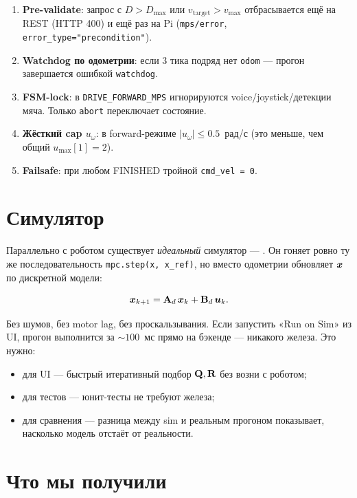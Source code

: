 \begin{enumerate}
  \item \textbf{Pre-validate}: запрос с $D > D_\text{max}$ или
        $v_\text{target} > v_\text{max}$ отбрасывается ещё на REST
        (HTTP 400) и ещё раз на Pi (\texttt{mps/error},
        \texttt{error\_type="precondition"}).
  \item \textbf{Watchdog по одометрии}: если 3 тика подряд нет
        \texttt{odom} --- прогон завершается ошибкой
        \texttt{watchdog}.
  \item \textbf{FSM-lock}: в \texttt{DRIVE\_FORWARD\_MPS} игнорируются
        voice/joystick/детекции мяча. Только \texttt{abort} переключает
        состояние.
  \item \textbf{Жёсткий cap $u_\omega$}: в forward-режиме $|u_\omega|
        \le 0.5$~рад/с (это меньше, чем общий $u_\text{max}[1] = 2$).
  \item \textbf{Failsafe}: при любом FINISHED тройной \texttt{cmd\_vel = 0}.
\end{enumerate}

\section{Симулятор}

Параллельно с роботом существует \emph{идеальный} симулятор ---
. Он гоняет ровно ту же
последовательность \texttt{mpc.step(x, x\_ref)}, но вместо одометрии
обновляет $\bm{x}$ по дискретной модели:

\[
  \bm{x}_{k+1} = \mathbf{A}_d\,\bm{x}_k + \mathbf{B}_d\,\bm{u}_k.
\]

Без шумов, без motor lag, без проскальзывания. Если запустить «Run on Sim»
из UI, прогон выполнится за $\sim 100$~мс прямо на бэкенде --- никакого
железа. Это нужно:

\begin{itemize}
  \item для UI --- быстрый итеративный подбор $\mathbf{Q}, \mathbf{R}$ без
        возни с роботом;
  \item для тестов --- юнит-тесты не требуют железа;
  \item для сравнения --- разница между sim и реальным прогоном
        показывает, насколько модель отстаёт от реальности.
\end{itemize}

\section{Что мы получили}

